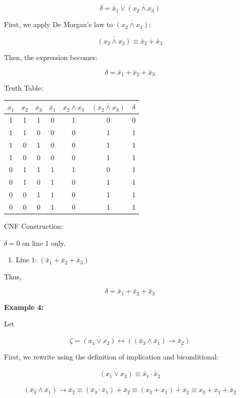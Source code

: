 \documentclass[12pt,a4paper,openany]{article}
\begin{document}
\[\delta = \bar{x}_1 \lor \overline{(x_2 \land x_3)}\]

First, we apply De Morgan's law to $\overline{(x_2 \land x_3)}$:

\[\overline{(x_2 \land x_3)} \equiv \bar{x}_2 + \bar{x}_3\]

Then, the expression becomes:

\[
\delta = \bar{x}_1 + \bar{x}_2 + \bar{x}_3
\]

Truth Table:

\begin{center}
\begin{tabular}{|c|c|c|c|c|c|c|}
\hline
$x_1$ & $x_2$ & $x_3$ & $\bar{x}_1$ & $x_2 \land x_3$ & $\overline{(x_2 \land x_3)}$ & $\delta$ \\
\hline
1 & 1 & 1 & 0 & 1 & 0 & 0 \\
\hline
1 & 1 & 0 & 0 & 0 & 1 & 1 \\
\hline
1 & 0 & 1 & 0 & 0 & 1 & 1 \\
\hline
1 & 0 & 0 & 0 & 0 & 1 & 1 \\
\hline
0 & 1 & 1 & 1 & 1 & 0 & 1 \\
\hline
0 & 1 & 0 & 1 & 0 & 1 & 1 \\
\hline
0 & 0 & 1 & 1 & 0 & 1 & 1 \\
\hline
0 & 0 & 0 & 1 & 0 & 1 & 1 \\
\hline
\end{tabular}
\end{center}

CNF Construction:

$\delta = 0$ on line 1 only.

\begin{enumerate}
\item Line 1: $(\bar{x}_1 + \bar{x}_2 + \bar{x}_3)$
\end{enumerate}

Thus,

\[
\delta = \bar{x}_1 + \bar{x}_2 + \bar{x}_3
\]


\textbf{Example 4:}

Let

\[\zeta = \overline{(x_1 \lor x_2)} \leftrightarrow ((\bar{x}_3 \land \bar{x}_1) \to \bar{x}_2)\]

First, we rewrite using the definition of implication and biconditional:

\[\overline{(x_1 \lor x_2)} \equiv \bar{x}_1 \cdot \bar{x}_2\]

\[(\bar{x}_3 \land \bar{x}_1) \to \bar{x}_2 \equiv \overline{(\bar{x}_3 \cdot \bar{x}_1)} + \bar{x}_2 \equiv (x_3 + x_1) + \bar{x}_2 \equiv x_3 + x_1 + \bar{x}_2\]
\end{document}
